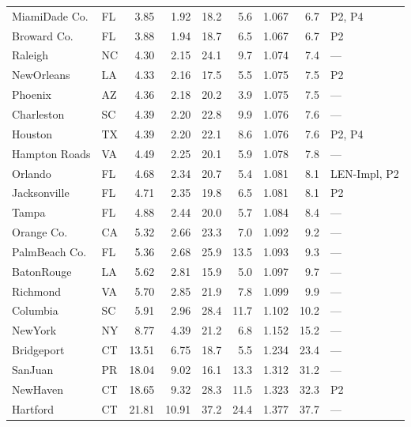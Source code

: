 \documentclass[11pt]{article}
\begin{document}
\begin{longtable}{llrrrrrrl}
MiamiDade Co. & FL & 3.85 & 1.92 & 18.2 & 5.6 & 1.067 & 6.7 & P2, P4 \\
Broward Co. & FL & 3.88 & 1.94 & 18.7 & 6.5 & 1.067 & 6.7 & P2 \\
Raleigh & NC & 4.30 & 2.15 & 24.1 & 9.7 & 1.074 & 7.4 & --- \\
NewOrleans & LA & 4.33 & 2.16 & 17.5 & 5.5 & 1.075 & 7.5 & P2 \\
Phoenix & AZ & 4.36 & 2.18 & 20.2 & 3.9 & 1.075 & 7.5 & --- \\
Charleston & SC & 4.39 & 2.20 & 22.8 & 9.9 & 1.076 & 7.6 & --- \\
Houston & TX & 4.39 & 2.20 & 22.1 & 8.6 & 1.076 & 7.6 & P2, P4 \\
Hampton Roads & VA & 4.49 & 2.25 & 20.1 & 5.9 & 1.078 & 7.8 & --- \\
Orlando & FL & 4.68 & 2.34 & 20.7 & 5.4 & 1.081 & 8.1 & LEN-Impl, P2 \\
Jacksonville & FL & 4.71 & 2.35 & 19.8 & 6.5 & 1.081 & 8.1 & P2 \\
Tampa & FL & 4.88 & 2.44 & 20.0 & 5.7 & 1.084 & 8.4 & --- \\
Orange Co. & CA & 5.32 & 2.66 & 23.3 & 7.0 & 1.092 & 9.2 & --- \\
PalmBeach Co. & FL & 5.36 & 2.68 & 25.9 & 13.5 & 1.093 & 9.3 & --- \\
BatonRouge & LA & 5.62 & 2.81 & 15.9 & 5.0 & 1.097 & 9.7 & --- \\
Richmond & VA & 5.70 & 2.85 & 21.9 & 7.8 & 1.099 & 9.9 & --- \\
Columbia & SC & 5.91 & 2.96 & 28.4 & 11.7 & 1.102 & 10.2 & --- \\
NewYork & NY & 8.77 & 4.39 & 21.2 & 6.8 & 1.152 & 15.2 & --- \\
Bridgeport & CT & 13.51 & 6.75 & 18.7 & 5.5 & 1.234 & 23.4 & --- \\
SanJuan & PR & 18.04 & 9.02 & 16.1 & 13.3 & 1.312 & 31.2 & --- \\
NewHaven & CT & 18.65 & 9.32 & 28.3 & 11.5 & 1.323 & 32.3 & P2 \\
Hartford & CT & 21.81 & 10.91 & 37.2 & 24.4 & 1.377 & 37.7 & --- \\
\end{longtable}
\end{document}

